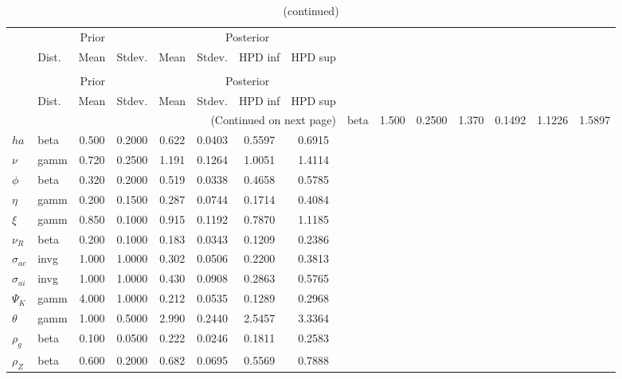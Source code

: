  
\begin{center}
\begin{longtable}{llcccccc} 
\caption{Results from Metropolis-Hastings (parameters)}
 \label{Table:MHPosterior:1}\\
\toprule 
  & \multicolumn{3}{c}{Prior}  &  \multicolumn{4}{c}{Posterior} \\
  \cmidrule(r{.75em}){2-4} \cmidrule(r{.75em}){5-8}
  & Dist. & Mean  & Stdev. & Mean & Stdev. & HPD inf & HPD sup\\
\midrule \endfirsthead 
\caption{(continued)}\\\toprule 
  & \multicolumn{3}{c}{Prior}  &  \multicolumn{4}{c}{Posterior} \\
  \cmidrule(r{.75em}){2-4} \cmidrule(r{.75em}){5-8}
  & Dist. & Mean  & Stdev. & Mean & Stdev. & HPD inf & HPD sup\\
\midrule \endhead 
\bottomrule \multicolumn{8}{r}{(Continued on next page)} \endfoot 
\bottomrule \endlastfoot 
${\sigma}$ & beta &   1.500 & 0.2500 &   1.370& 0.1492 &  1.1226 &  1.5897 \\ 
${ha}$ & beta &   0.500 & 0.2000 &   0.622& 0.0403 &  0.5597 &  0.6915 \\ 
$\nu$ & gamm &   0.720 & 0.2500 &   1.191& 0.1264 &  1.0051 &  1.4114 \\ 
${\phi}$ & beta &   0.320 & 0.2000 &   0.519& 0.0338 &  0.4658 &  0.5785 \\ 
${\eta}$ & gamm &   0.200 & 0.1500 &   0.287& 0.0744 &  0.1714 &  0.4084 \\ 
$\xi$ & gamm &   0.850 & 0.1000 &   0.915& 0.1192 &  0.7870 &  1.1185 \\ 
${\nu_R}$ & beta &   0.200 & 0.1000 &   0.183& 0.0343 &  0.1209 &  0.2386 \\ 
${\sigma_{ac}}$ & invg &   1.000 & 1.0000 &   0.302& 0.0506 &  0.2200 &  0.3813 \\ 
${\sigma_{ai}}$ & invg &   1.000 & 1.0000 &   0.430& 0.0908 &  0.2863 &  0.5765 \\ 
${\Psi_{K}}$ & gamm &   4.000 & 1.0000 &   0.212& 0.0535 &  0.1289 &  0.2968 \\ 
${\theta}$ & gamm &   1.000 & 0.5000 &   2.990& 0.2440 &  2.5457 &  3.3364 \\ 
${\rho_g}$ & beta &   0.100 & 0.0500 &   0.222& 0.0246 &  0.1811 &  0.2583 \\ 
${\rho_Z}$ & beta &   0.600 & 0.2000 &   0.682& 0.0695 &  0.5569 &  0.7888 \\ 

\end{longtable}
\end{center}
